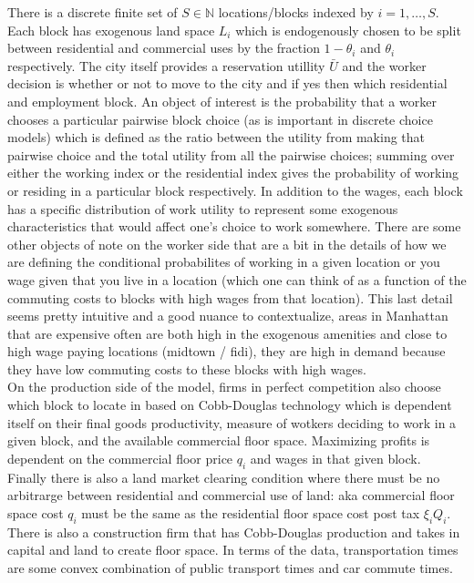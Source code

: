 \documentclass[11pt,english]{article}
\begin{document}
\noindent There is a discrete finite set of $S\in \mathbb{N}$ locations/blocks indexed by $i=1, \ldots, S$. Each block has exogenous land space $L_i$ which is endogenously chosen to be split between residential and commercial uses by the fraction $1-\theta_i$ and $\theta_i$ respectively. The city itself provides a reservation utillity $\bar{U}$ and the worker decision is whether or not to move to the city and if yes then which residential and employment block. An object of interest is the probability that a worker chooses a particular pairwise block choice (as is important in discrete choice models) which is defined as the ratio between the utility from making that pairwise choice and the total utility from all the pairwise choices; summing over either the working index or the residential index gives the probability of working or residing in a particular block respectively. In addition to the wages, each block has a specific distribution of work utility to represent some exogenous characteristics that would affect one's choice to work somewhere. There are some other objects of note on the worker side that are a bit in the details of how we are defining the conditional probabilites of working in a given location or you wage given that you live in a location (which one can think of as a function of the commuting costs to blocks with high wages from that location). This last detail seems pretty intuitive and a good nuance to contextualize, areas in Manhattan that are expensive often are both high in the exogenous amenities and close to high wage paying locations (midtown / fidi), they are high in demand because they have low commuting costs to these blocks with high wages.\\

\noindent On the production side of the model, firms in perfect competition also choose which block to locate in based on Cobb-Douglas technology which is dependent itself on their final goods productivity, measure of wotkers deciding to work in a given block, and the available commercial floor space. Maximizing profits is dependent on the commercial floor price $q_i$ and wages in that given block.\\

\noindent Finally there is also a land market clearing condition where there must be no arbitrarge between residential and commercial use of land: aka commercial floor space cost $q_i$ must be the same as the residential floor space cost post tax $\xi_i Q_i$. There is also a construction firm that has Cobb-Douglas production and takes in capital and land to create floor space. In terms of the data, transportation times are some convex combination of public transport times and car commute times.
\end{document}
